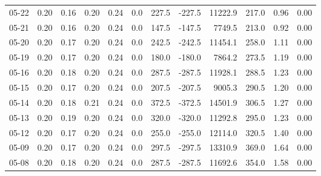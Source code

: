 \begin{threeparttable}
{\begin{tabular}{lrrrrrrrrrrr}
  05-22 &          0.20 &          0.16 &          0.20 &        0.24 &                 0.0 &               227.5 &     -227.5 &             11222.9 &            217.0 &            0.96 &                   0.00 \\
  05-21 &          0.20 &          0.16 &          0.20 &        0.24 &                 0.0 &               147.5 &     -147.5 &              7749.5 &            213.0 &            0.92 &                   0.00 \\
  05-20 &          0.20 &          0.17 &          0.20 &        0.24 &                 0.0 &               242.5 &     -242.5 &             11454.1 &            258.0 &            1.11 &                   0.00 \\
  05-19 &          0.20 &          0.17 &          0.20 &        0.24 &                 0.0 &               180.0 &     -180.0 &              7864.2 &            273.5 &            1.19 &                   0.00 \\
  05-16 &          0.20 &          0.18 &          0.20 &        0.24 &                 0.0 &               287.5 &     -287.5 &             11928.1 &            288.5 &            1.23 &                   0.00 \\
  05-15 &          0.20 &          0.17 &          0.20 &        0.24 &                 0.0 &               207.5 &     -207.5 &              9005.3 &            290.5 &            1.20 &                   0.00 \\
  05-14 &          0.20 &          0.18 &          0.21 &        0.24 &                 0.0 &               372.5 &     -372.5 &             14501.9 &            306.5 &            1.27 &                   0.00 \\
  05-13 &          0.20 &          0.19 &          0.20 &        0.24 &                 0.0 &               320.0 &     -320.0 &             11292.8 &            295.0 &            1.23 &                   0.00 \\
  05-12 &          0.20 &          0.17 &          0.20 &        0.24 &                 0.0 &               255.0 &     -255.0 &             12114.0 &            320.5 &            1.40 &                   0.00 \\
  05-09 &          0.20 &          0.17 &          0.20 &        0.24 &                 0.0 &               297.5 &     -297.5 &             13310.9 &            369.0 &            1.64 &                   0.00 \\
  05-08 &          0.20 &          0.18 &          0.20 &        0.24 &                 0.0 &               287.5 &     -287.5 &             11692.6 &            354.0 &            1.58 &                   0.00 \\

\end{tabular}}
\end{threeparttable}
